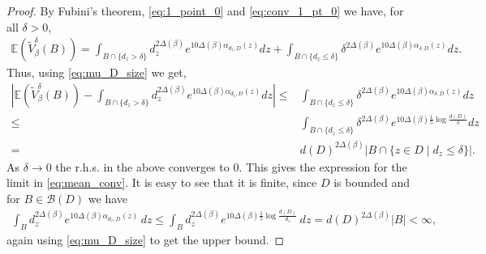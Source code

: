 \documentclass[10pt,a4paper]{amsart}
\newcommand{\C}{\mathbb{C}}
\newcommand{\E}{\mathbb{E}}
\newcommand{\mc}{\mathcal}
\begin{document}
	\begin{proof}
		By Fubini's theorem, \eqref{eq:1_point_0} and \eqref{eq:conv_1_pt_0} we have, for all $\delta>0$, 
		\begin{align}
			\E (\tilde{V}^{\delta}_{\beta}(B)) 
			=  \int_{B \cap \{d_z > \delta\}} d_z^{2\Delta(\beta)} e^{10 \Delta(\beta) \alpha_{d_z, D}(z)} dz + \int_{B \cap \{d_z \le \delta\}} \delta^{2\Delta(\beta)} e^{10 \Delta(\beta) \alpha_{\delta, D}(z)} dz.
		\end{align}
		Thus, using \eqref{eq:mu_D_size} we get,
		\begin{align}
			\left| \E (\tilde{V}^{\delta}_{\beta}(B)) - \int_{B \cap \{d_z > \delta\}} d_z^{2\Delta(\beta)} e^{10 \Delta(\beta) \alpha_{d_z, D}(z)} dz \right| 			
			\le & \int_{B \cap \{d_z \le \delta\}} \delta^{2\Delta(\beta)} e^{10 \Delta(\beta) \alpha_{\delta, D}(z)} dz
			\nonumber \\
			\le & \int_{B \cap \{d_z \le \delta\}} \delta^{2\Delta(\beta)} e^{10 \Delta(\beta) \frac{1}{5} \log \frac{d(D)}{\delta}} dz
			\nonumber \\
			= & d(D)^{2\Delta(\beta)} |B \cap \{ z \in D \mid d_z \le \delta\}|.
		\end{align}
		As $\delta \to 0$ the r.h.s. in the above converges to $0$. This gives the expression for the limit in \eqref{eq:mean_conv}. It is easy to see that it is finite, since $D$ is bounded and for $B \in \mc{B}(D)$ we have
		\begin{align}
			\int_B d_z^{2\Delta(\beta)} e^{10\Delta(\beta) \alpha_{d_z, D}(z)} \, dz \le \int_B d_z^{2\Delta(\beta)} e^{10\Delta(\beta) \frac{1}{5} \log \frac{d(D)}{d_z}} \, dz = d(D)^{2\Delta(\beta)} |B| < \infty,
		\end{align}
         again using \eqref{eq:mu_D_size} to get the upper bound.
	\end{proof}
\end{document}
